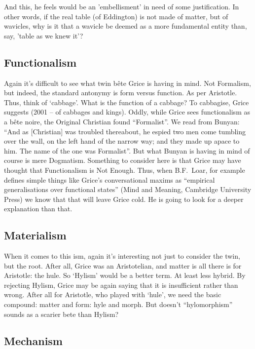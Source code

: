 \documentclass[10pt,titlepage]{book}
\begin{document}
And this, he feels would be an 'embellisment' in need of some
justification. In other words, if the real table (of Eddington) is not
made of matter, but of wavicles, why is it that a wavicle be deemed as
a more fundamental entity than, say, 'table as we knew it'?

\subsection{Functionalism}

Again it’s difficult to see what twin bête Grice is having 
in mind. Not  Formalism, but indeed, the standard antonymy is form versus 
function. As per  Aristotle. Thus, think of ‘cabbage’. What is the function 
of a cabbage? To  cabbagise, Grice suggests (2001 – of cabbages and kings). 
Oddly, while Grice  sees functionalism as a bête noire, the Original 
Christian found “Formalist”. We  read from Bunyan: “And as [Christian] was troubled 
thereabout, he espied  two men come tumbling over the wall, on the left 
hand of the narrow way; and  they made up apace to him. The name of the one was 
Formalist”. But what Bunyan  is having in mind of course is mere Dogmatism. 
Something to consider here is  that Grice may have thought that 
Functionalism is Not Enough. Thus, when B.F.~Loar, for example defines simple things 
like Grice’s conversational maxims as  “empirical generalisations over 
functional states” (Mind and Meaning, Cambridge  University Press) we know that 
that will leave Grice cold. He is going to look  for a deeper explanation 
than that. 

\subsection{Materialism}

When  it comes to this ism, again it’s interesting not just to 
consider the twin, but  the root. After all, Grice was an Aristotelian, and 
matter is all there is for  Aristotle: the hule. So ‘Hylism’ would be a 
better term. At least less hybrid.  By rejecting Hylism, Grice may be again 
saying that it is insufficient rather  than wrong. After all for Aristotle, 
who played with ‘hule’, we need the basic  compound: matter and form: hyle 
and morph. But doesn’t “hylomorphism” sounds as  a scarier bete than Hylism? 

\subsection{Mechanism}
\end{document}
